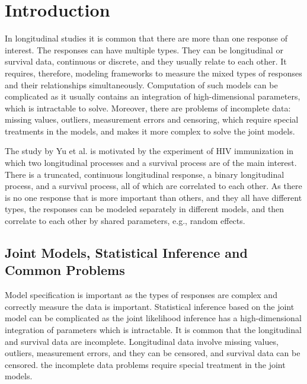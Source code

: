 \section{Introduction}
\label{sec:intro}

In longitudinal studies it is common that there are more than one response of interest. The responses can have multiple types. They can be longitudinal or survival data, continuous or discrete, and they usually relate to each other. It requires, therefore, modeling frameworks to measure the mixed types of responses and their relationships simultaneously. Computation of such models can be complicated as it usually contains an integration of high-dimensional parameters, which is intractable to solve.
Moreover, there are problems of incomplete data: missing values, outliers, measurement errors and censoring, which require special treatments in the models, and makes it more complex to solve the joint models.


The study by Yu et al. \cite{yu2018joint} is motivated by the experiment of HIV immunization in which two longitudinal processes and a survival process are of the main interest. There is a truncated, continuous longitudinal response, a binary longitudinal process, and a survival process, all of which are correlated to each other.
As there is no one response that is more important than others, and they all have different types, the responses can be modeled separately in different models, and then correlate to each other by shared parameters, e.g., random effects.


\subsection{Joint Models, Statistical Inference and Common Problems}

Model specification is important as the types of responses are complex and correctly measure the data is important. Statistical inference based on the joint model can be complicated as the joint likelihood inference has a high-dimensional integration of parameters which is intractable. It is common that the longitudinal and survival data are incomplete. Longitudinal data involve missing values, outliers, measurement errors, and they can be censored, and survival data can be censored. the incomplete data problems require special treatment in the joint models.

